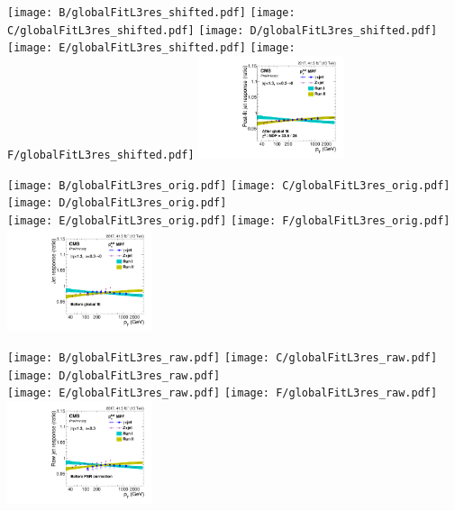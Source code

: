 \documentclass[landscape,10pt]{beamer} %
\begin{document}

\texttt{[image: B/globalFitL3res\_shifted.pdf]}
\texttt{[image: C/globalFitL3res\_shifted.pdf]}
\texttt{[image: D/globalFitL3res\_shifted.pdf]}\\
\texttt{[image: E/globalFitL3res\_shifted.pdf]}
\texttt{[image: F/globalFitL3res\_shifted.pdf]}
\includegraphics[width=0.32\textwidth]{BCDEF/globalFitL3res_shifted.pdf}\\

\newpage

\texttt{[image: B/globalFitL3res\_orig.pdf]}
\texttt{[image: C/globalFitL3res\_orig.pdf]}
\texttt{[image: D/globalFitL3res\_orig.pdf]}\\
\texttt{[image: E/globalFitL3res\_orig.pdf]}
\texttt{[image: F/globalFitL3res\_orig.pdf]}
\includegraphics[width=0.32\textwidth]{BCDEF/globalFitL3res_orig.pdf}\\
\newpage

\texttt{[image: B/globalFitL3res\_raw.pdf]}
\texttt{[image: C/globalFitL3res\_raw.pdf]}
\texttt{[image: D/globalFitL3res\_raw.pdf]}\\
\texttt{[image: E/globalFitL3res\_raw.pdf]}
\texttt{[image: F/globalFitL3res\_raw.pdf]}
\includegraphics[width=0.32\textwidth]{BCDEF/globalFitL3res_raw.pdf}\\
\end{document}
